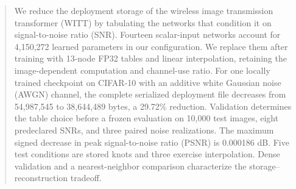 \begin{abstract}
We reduce the deployment storage of the wireless image transmission transformer (WITT) by tabulating the networks that condition it on signal-to-noise ratio (SNR). Fourteen scalar-input networks account for 4,150,272 learned parameters in our configuration. We replace them after training with 13-node FP32 tables and linear interpolation, retaining the image-dependent computation and channel-use ratio. For one locally trained checkpoint on CIFAR-10 with an additive white Gaussian noise (AWGN) channel, the complete serialized deployment file decreases from 54,987,545 to 38,644,489 bytes, a 29.72\% reduction. Validation determines the table choice before a frozen evaluation on 10,000 test images, eight predeclared SNRs, and three paired noise realizations. The maximum signed decrease in peak signal-to-noise ratio (PSNR) is 0.000186 dB. Five test conditions are stored knots and three exercise interpolation. Dense validation and a nearest-neighbor comparison characterize the storage--reconstruction tradeoff.
\end{abstract}
